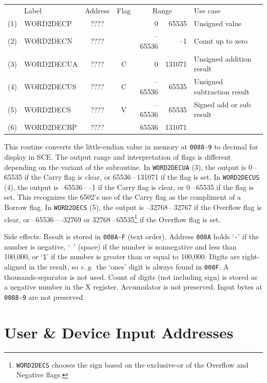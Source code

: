 \documentclass[12pt]{{memoir}}
\begin{document}
\begin{center}\begin{tabular}{r>{\ttfamily}l>{\ttfamily}ccr@{\,--\,}rl}
& \textrm{Label} & \textrm{Address} & Flag & \multicolumn{2}{c}{\phantom{--}Range} & Use case \\
(1) & WORD2DECP & ???? & & 0&65535 & Unsigned value \\
(2) & WORD2DECN & ???? & & --65536&--1 & Count up to zero \\
(3) & WORD2DECUA & ???? & C & 0&131071 & Unsigned addition result \\
(4) & WORD2DECUS & ???? & C & --65536&65535 & Unsigned subtraction result \\
(5) & WORD2DECS & ???? & V & --65536&65535 & Signed add or sub result \\
(6) & WORD2DECBP & ???? & & 65536&131071 \\
\end{tabular}\end{center}

This routine converts the little-endian value in memory at \texttt{0088-9} to decimal for display in SCE. The output range and interpretation of flags is different depending on the variant of the subroutine. In \texttt{WORD2DECUA} (3), the output is 0\,--\,65535 if the Carry flag is clear, or 65536\,--\,131071 if the flag is set. In \texttt{WORD2DECUS} (4), the output is --65536\,--\,--1 if the Carry flag is clear, or 0\,--\,65535 if the flag is set. This recognizes the 6502's use of the Carry flag as the compliment of a Borrow flag. In \texttt{WORD2DECS} (5), the output is --32768\,--\,32767 if the Overflow flag is clear, or --65536\,--\,--32769 or 32768\,--\,65535\footnote{\texttt{WORD2DECS} chooses the sign based on the exclusive-or of the Overflow and Negative flags.} if the Overflow flag is set.

Side effects: Result is stored in \texttt{008A-F} (text order). Address \texttt{008A} holds `\texttt{-}' if the number is negative, `\texttt{ }' (space) if the number is nonnegative and less than 100,000, or `\texttt{1}' if the number is greater than or equal to 100,000. Digits are right-aligned in the result, so \textit{e.\,g.}\ the `ones' digit is always found in \texttt{008F}. A thousands-separator is not used. Count of digits (not including sign) is stored as a negative number in the X register. Accumulator is not preserved. Input bytes at \texttt{0088-9} are not preserved.

\newpage
\section{User \& Device Input Addresses}
\label{sec:userinput}
\end{document}

